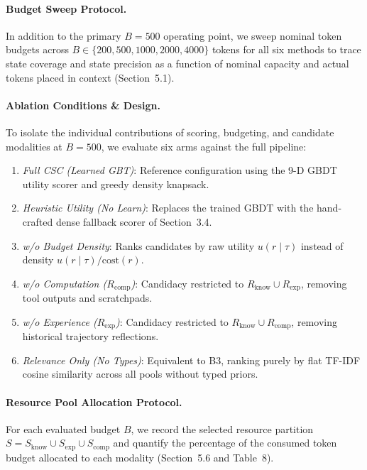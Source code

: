 \documentclass{article}
\begin{document}
\paragraph{Budget Sweep Protocol.} In addition to the primary $B=500$ operating point, we sweep nominal token budgets across $B \in \{200, 500, 1000, 2000, 4000\}$ tokens for all six methods to trace state coverage and state precision as a function of nominal capacity and actual tokens placed in context (Section~5.1).

\paragraph{Ablation Conditions \& Design.} To isolate the individual contributions of scoring, budgeting, and candidate modalities at $B=500$, we evaluate six arms against the full pipeline:
\begin{enumerate}
\item \textit{Full CSC (Learned GBT)}: Reference configuration using the 9-D GBDT utility scorer and greedy density knapsack.
\item \textit{Heuristic Utility (No Learn)}: Replaces the trained GBDT with the hand-crafted dense fallback scorer of Section~3.4.
\item \textit{w/o Budget Density}: Ranks candidates by raw utility $u(r \mid \tau)$ instead of density $u(r \mid \tau)/\text{cost}(r)$.
\item \textit{w/o Computation ($R_{\text{comp}}$)}: Candidacy restricted to $R_{\text{know}} \cup R_{\text{exp}}$, removing tool outputs and scratchpads.
\item \textit{w/o Experience ($R_{\text{exp}}$)}: Candidacy restricted to $R_{\text{know}} \cup R_{\text{comp}}$, removing historical trajectory reflections.
\item \textit{Relevance Only (No Types)}: Equivalent to B3, ranking purely by flat TF-IDF cosine similarity across all pools without typed priors.
\end{enumerate}

\paragraph{Resource Pool Allocation Protocol.} For each evaluated budget $B$, we record the selected resource partition $S = S_{\text{know}} \cup S_{\text{exp}} \cup S_{\text{comp}}$ and quantify the percentage of the consumed token budget allocated to each modality (Section~5.6 and Table~8).
\end{document}

